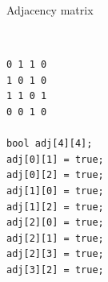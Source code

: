 \documentclass[10pt]{beamer}
\begin{document}
\begin{frame}[fragile]{Adjacency matrix}

    \begin{columns}[T]
        \begin{column}{.4\textwidth}
            \begin{verbatim}

0 1 1 0
1 0 1 0
1 1 0 1
0 0 1 0

bool adj[4][4];
adj[0][1] = true;
adj[0][2] = true;
adj[1][0] = true;
adj[1][2] = true;
adj[2][0] = true;
adj[2][1] = true;
adj[2][3] = true;
adj[3][2] = true;
            \end{verbatim}
        \end{column}%
        \hfill%
        \begin{column}{.4\textwidth}
            \begin{figure}
            \end{figure}
        \end{column}%
    \end{columns}
\end{frame}
\end{document}
